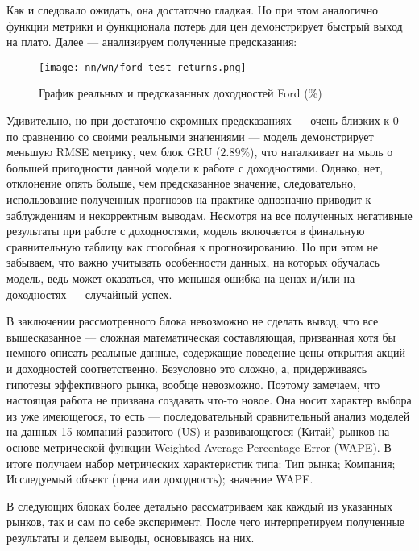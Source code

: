 \noindent Как и следовало ожидать, она достаточно гладкая. Но при этом аналогично функции метрики и функционала потерь для цен демонстрирует быстрый выход на плато. Далее --- анализируем полученные предсказания:
\begin{figure}[H]
	\centering
	\texttt{[image: nn/wn/ford\_test\_returns.png]}
	\caption{График реальных и предсказанных доходностей Ford (\%)}
	\label{fig::wn_ford_test_returns}
\end{figure} 
Удивительно, но при достаточно скромных предсказаниях --- очень близких к $0$ по сравнению со своими реальными значениями --- модель демонстрирует меньшую RMSE метрику, чем блок GRU ($2.89\%$), что наталкивает на мыль о большей пригодности данной модели к работе с доходностями. Однако, нет, отклонение опять больше, чем предсказанное значение, следовательно, использование полученных прогнозов на практике однозначно приводит к заблуждениям и некорректным выводам. Несмотря на все полученных негативные результаты при работе с доходностями, модель включается в финальную сравнительную таблицу как способная к прогнозированию. Но при этом не забываем, что важно учитывать особенности данных, на которых обучалась модель, ведь может оказаться, что меньшая ошибка на ценах и/или на доходностях --- случайный успех.

В заключении рассмотренного блока невозможно не сделать вывод, что все вышесказанное --- сложная математическая составляющая, призванная хотя бы немного описать реальные данные, содержащие поведение цены открытия акций и доходностей соответственно. Безусловно это сложно, а, придерживаясь гипотезы эффективного рынка, вообще невозможно. Поэтому замечаем, что настоящая работа не призвана создавать что-то новое. Она носит характер выбора из уже имеющегося, то есть --- последовательный сравнительный анализ моделей на данных 15 компаний развитого (US) и развивающегося (Китай) рынков на основе метрической функции Weighted Average Percentage Error (WAPE). В итоге получаем набор метрических характеристик типа: Тип рынка; Компания; Исследуемый объект (цена или доходность); значение WAPE.

В следующих блоках более детально рассматриваем как каждый из указанных рынков, так и сам по себе эксперимент. После чего интерпретируем полученные результаты и делаем выводы, основываясь на них.